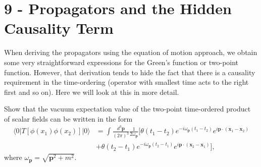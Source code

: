 \documentclass[working, oneside]{../../Preambles/tuftebook}
\begin{document}
\let\cleardoublepage\clearpage
\thispagestyle{fancy}
\chapter{9 - Propagators and the Hidden Causality Term}

When deriving the propagators using the equation of motion approach, we obtain some very straightforward expressions for the Green's function or two-point function. However, that derivation tends to hide the fact that there is a causality requirement in the time-ordering (operator with smallest time acts to the right first and so on). Here we will look at this in more detail.

\begin{exercise}[1]
Show that the vacuum expectation value of the two-point time-ordered product of scalar fields can be written in the form
\begin{align*}
    \langle 0 | T \left[ \phi(x_1) \phi(x_2) \right] | 0 \rangle &= \int \frac{d^3 \mathbf{p}}{(2\pi)^3} \frac{1}{2 \omega_\mathbf{p}} [ \theta(t_1 - t_2) e^{-i \omega_\mathbf{p} (t_1 - t_2)} e^{i \mathbf{p} \cdot (\mathbf{x}_1 - \mathbf{x}_2)} \\
&+ \theta(t_2 - t_1) e^{-i \omega_\mathbf{p} (t_2 - t_1)} e^{i \mathbf{p} \cdot (\mathbf{x}_2 - \mathbf{x}_1)} ],
\end{align*}
where $\omega_\mathbf{p} = \sqrt{\mathbf{p}^2 + m^2}$.
\end{exercise}
\end{document}
